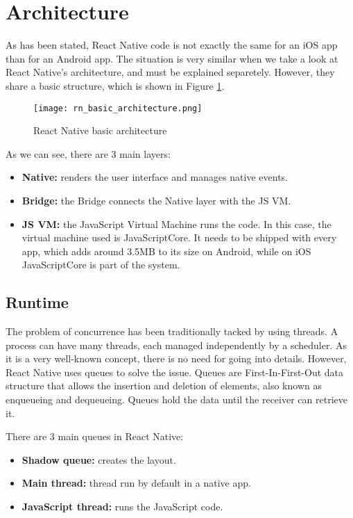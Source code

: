 \section{Architecture}

As has been stated, React Native code is not exactly the same for an iOS app than for an Android app. The situation is very similar when we take a look at React Native's architecture, and must be explained separetely. However, they share a basic structure, which is shown in Figure \ref{fig:rnbasicarch}.

\begin{figure}[H]
	\centering
	\texttt{[image: rn\_basic\_architecture.png]}
	\caption{React Native basic architecture\label{fig:rnbasicarch}}
\end{figure}

As we can see, there are 3 main layers:

\begin{itemize}
 \item \textbf{Native:} renders the user interface and manages native events.
 \item \textbf{Bridge:} the Bridge connects the Native layer with the JS VM.
 \item \textbf{JS VM:} the JavaScript Virtual Machine runs the code. In this case, the virtual machine used is JavaScriptCore. It needs to be shipped with every app, which adds around 3.5MB to its size on Android, while on iOS JavaScriptCore is part of the system.
\end{itemize}

\subsection{Runtime}

The problem of concurrence has been traditionally tacked by using threads. A process can have many threads, each managed independently by a scheduler. As it is a very well-known concept, there is no need for going into details. However, React Native uses queues to solve the issue. Queues are First-In-First-Out data structure that allows the insertion and deletion of elements, also known as enqueueing and dequeueing. Queues hold the data until the receiver can retrieve it.

There are 3 main queues in React Native:

\begin{itemize}
 \item \textbf{Shadow queue:} creates the layout.
 \item \textbf{Main thread:} thread run by default in a native app.
 \item \textbf{JavaScript thread:} runs the JavaScript code.
\end{itemize}

